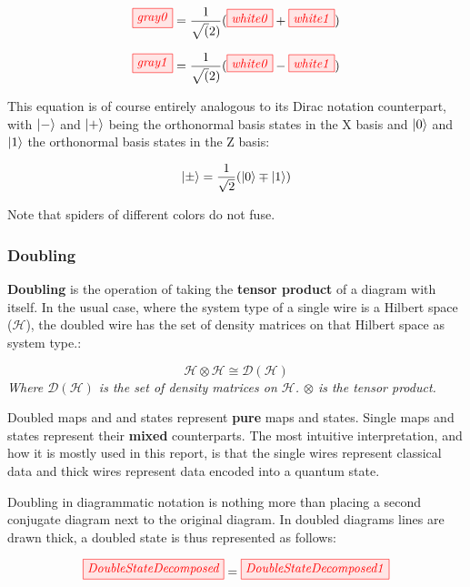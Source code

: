 \documentclass[]{article}
\begin{document}
\begin{equation}
\tikzfig{gray0} =\frac{1}{\sqrt(2)}( \tikzfig{white0} + \tikzfig{white1})
\end{equation}

\begin{equation}
\tikzfig{gray1} =\frac{1}{\sqrt(2)}( \tikzfig{white0} - \tikzfig{white1})
\end{equation}

This equation is of course entirely analogous to its Dirac notation counterpart, with $\ket{-}$ and $\ket{+}$ being the orthonormal basis states in the X basis and $\ket{0}$ and $\ket{1}$ the orthonormal basis states in the Z basis:

\begin{equation}
\ket{\pm} = \frac{1}{\sqrt{2}}(\ket{0} \mp \ket{1})
\end{equation}

Note that spiders of different colors do not fuse.

\subsubsection{Doubling}
\label{doubling}

\textbf{Doubling} is the operation of taking the \textbf{tensor product} of a diagram with itself. In the usual case, where the system type of a single wire is a Hilbert space ($\mathcal{H}$), the doubled wire has the set of density matrices on that Hilbert space as system type.:

\begin{equation}
\mathcal{H} \otimes \mathcal{H} \cong \mathcal{D}(\mathcal{H})
\end{equation}
\textit{Where $\mathcal{D}(\mathcal{H})$ is the set of density matrices on $\mathcal{H}$. $\otimes$ is the tensor product.}

Doubled maps and and states represent \textbf{pure} maps and states. Single maps and states represent their \textbf{mixed} counterparts. The most intuitive interpretation, and how it is mostly used in this report, is that the single wires represent classical data and thick wires represent data encoded into a quantum state.

Doubling in diagrammatic notation is nothing more than placing a second conjugate diagram next to the original diagram. In doubled diagrams lines are drawn thick, a doubled state is thus represented as follows:

\begin{equation}
	\tikzfig{DoubleStateDecomposed} = \tikzfig{DoubleStateDecomposed1}
\end{equation}
\end{document}
